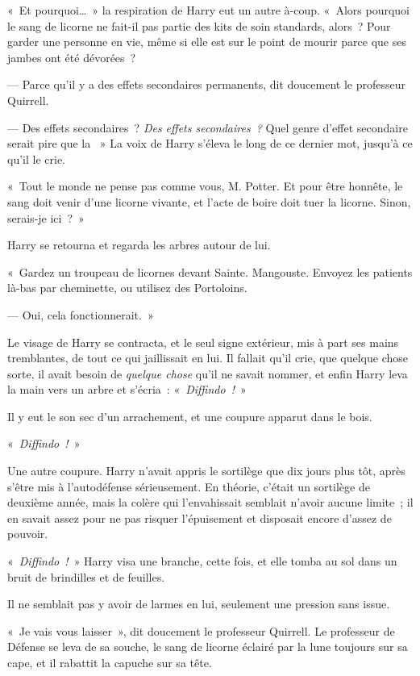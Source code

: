 «~Et pourquoi…~» la respiration de Harry eut un autre à-coup. «~Alors pourquoi le sang de licorne ne fait-il pas partie des kits de soin standards, alors~? Pour garder une personne en vie, même si elle est sur le point de mourir parce que ses jambes ont été dévorées~?

--- Parce qu'il y a des effets secondaires permanents, dit doucement le professeur Quirrell.

--- Des effets secondaires~? \emph{Des effets secondaires~?} Quel genre d'effet secondaire serait pire que la ~» La voix de Harry s'éleva le long de ce dernier mot, jusqu'à ce qu'il le crie.

«~Tout le monde ne pense pas comme vous, M. Potter. Et pour être honnête, le sang doit venir d'une licorne vivante, et l'acte de boire doit tuer la licorne. Sinon, serais-je ici~?~»

Harry se retourna et regarda les arbres autour de lui.

«~Gardez un troupeau de licornes devant Sainte. Mangouste. Envoyez les patients là-bas par cheminette, ou utilisez des Portoloins.

--- Oui, cela fonctionnerait.~»

Le visage de Harry se contracta, et le seul signe extérieur, mis à part ses mains tremblantes, de tout ce qui jaillissait en lui. Il fallait qu'il crie, que quelque chose sorte, il avait besoin de \emph{quelque chose} qu'il ne savait nommer, et enfin Harry leva la main vers un arbre et s'écria~: «~\emph{Diffindo~!}~»

Il y eut le son sec d'un arrachement, et une coupure apparut dans le bois.

«~\emph{Diffindo~!}~»

Une autre coupure. Harry n'avait appris le sortilège que dix jours plus tôt, après s'être mis à l'autodéfense sérieusement. En théorie, c'était un sortilège de deuxième année, mais la colère qui l'envahissait semblait n'avoir aucune limite~; il en savait assez pour ne pas risquer l'épuisement et disposait encore d'assez de pouvoir.

«~\emph{Diffindo~!}~» Harry visa une branche, cette fois, et elle tomba au sol dans un bruit de brindilles et de feuilles.

Il ne semblait pas y avoir de larmes en lui, seulement une pression sans issue.

«~Je vais vous laisser~», dit doucement le professeur Quirrell. Le professeur de Défense se leva de sa souche, le sang de licorne éclairé par la lune toujours sur sa cape, et il rabattit la capuche sur sa tête.
